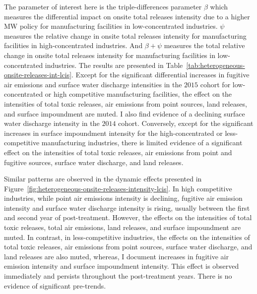 \documentclass[authoryear, preprint, twocolumn, 1p]{elsarticle}
\begin{document}
    The parameter of interest here is the triple-differences parameter $\beta$ which measures the differential impact on onsite total releases intensity due to a higher MW policy for manufacturing facilities in low-concentrated industries. $\psi$ measures the relative change in onsite total releases intensity for manufacturing facilities in high-concentrated industries. And $\beta + \psi$ measures the total relative change in onsite total releases intensity for manufacturing facilities in low-concentrated industries. The results are presented in Table~\ref{tab:heterogeneous-onsite-releases-int-lcis}. Except for the significant differential increases in fugitive air emissions and surface water discharge intensities in the $2015$ cohort for low-concentrated or high competitive manufacturing facilities, the effect on the intensities of total toxic releases, air emissions from point sources, land releases, and surface impoundment are muted. I also find evidence of a declining surface water discharge intensity in the $2014$ cohort. Conversely, except for the significant increases in surface impoundment intensity for the high-concentrated or less-competitive manufacturing industries, there is limited evidence of a significant effect on the intensities of total toxic releases, air emissions from point and fugitive sources, surface water discharge, and land releases.
    
    

    Similar patterns are observed in the dynamic effects presented in Figure~\ref{fig:heterogeneous-onsite-releases-intensity-lcis}. In high competitive industries, while point air emissions intensity is declining, fugitive air emission intensity and surface water discharge intensity is rising, usually between the first and second year of post-treatment. However, the effects on the intensities of total toxic releases, total air emissions, land releases, and surface impoundment are muted. In contrast, in less-competitive industries, the effects on the intensities of total toxic releases, air emissions from point sources, surface water discharge, and land releases are also muted, whereas, I document increases in fugitive air emission intensity and surface impoundment intensity. This effect is observed immediately and persists throughout the post-treatment years. There is no evidence of significant pre-trends.
\end{document}
